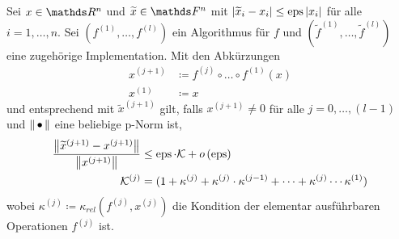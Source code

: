 \begin{Leme}[Fehlerfortpflanzung]
  \label{3.3.5} 
  Sei $x\in \Ren$ und $\widetilde{x}\in \F^n$ 
  mit $|\widetilde{x}_i-x_i|\leq \operatorname{eps}|x_i|$ für alle $i=1,\dotsc , n$.
  Sei $\left(f^{(1)},\dotsc ,f^{(l)}\right)$ ein Algorithmus für $f$ und 
  $(\widetilde{f}^{(1)},\dotsc ,\widetilde{f}^{(l)})$ 
  eine zugehörige Implementation.
  Mit den Abkürzungen
  \begin{align*}
    x^{(j+1)} &\coloneqq f^{(j)}\circ \dotsc \circ f^{(1)}(x) \\
    x^{(1)} &\coloneqq x
  \end{align*}
  und entsprechend mit $\widetilde{x}^{(j+1)}$ gilt,
  falls $x^{(j+1)} \neq 0$ für alle $j=0,\dotsc , (l-1)$ 
  und $\left\| \,\bullet\, \right\|$ eine beliebige p-Norm ist,
  \begin{align}
    \frac{\nn[\widetilde{x}^{(j+1)}-x^{(j+1)}]}{\nn[x^{(j+1)}]}
    &\leq \Eps \cdot \K + o\left(\Eps\right)
      \label{III.3.4} 
    \\ \nonumber
    \K^{(j)} &=(1+\kappa^{(j)}+\kappa^{(j)}\cdot \kappa^{(j-1)}
               + \dotsb
               + \kappa^{(j)}\dotsm\kappa^{(1)})
  \end{align}
  wobei $\kappa^{(j)} \coloneqq \kappa_{rel}(f^{(j)}, x^{(j)})$
  die Kondition der elementar ausführbaren Operationen $f^{(j)}$ ist.


\end{Leme}
